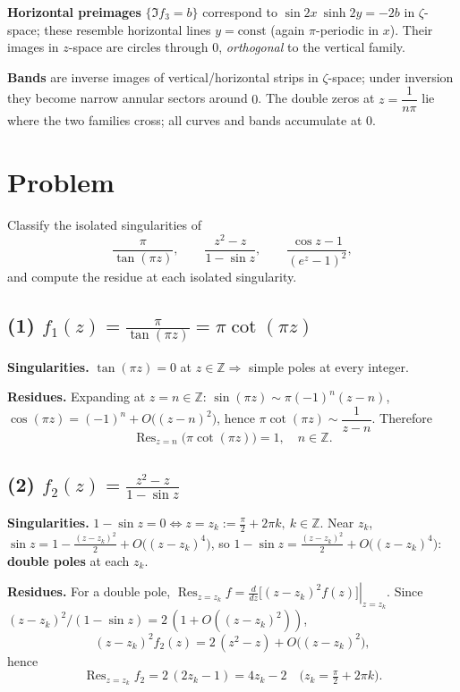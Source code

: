 \documentclass[12pt,a4paper]{article}
\begin{document}
	\textbf{Horizontal preimages} \(\{\Im f_3=b\}\) correspond to \(\sin 2x\ \sinh 2y=-2b\) in \(\zeta\)-space; these resemble horizontal lines \(y=\text{const}\) (again \(\pi\)-periodic in \(x\)).
	Their images in \(z\)-space are circles through \(0\), \emph{orthogonal} to the vertical family.
	
	\textbf{Bands} are inverse images of vertical/horizontal strips in \(\zeta\)-space; under inversion they become narrow annular sectors around \(0\).
	The double zeros at \(z=\dfrac{1}{n\pi}\) lie where the two families cross; all curves and bands accumulate at \(0\).
	
	\section*{Problem}
	Classify the isolated singularities of
	\[
	\frac{\pi}{\tan(\pi z)},\qquad
	\frac{z^2-z}{1-\sin z},\qquad
	\frac{\cos z-1}{(e^{z}-1)^2},
	\]
	and compute the residue at each isolated singularity.
	
	\bigskip
	
	\subsection*{(1) \(\displaystyle f_1(z)=\frac{\pi}{\tan(\pi z)}=\pi\cot(\pi z)\)}
	\textbf{Singularities.}
	\(\tan(\pi z)=0\) at \(z\in\mathbb Z\Rightarrow\) simple poles at every integer.
	
	\textbf{Residues.}
	Expanding at \(z=n\in\mathbb Z\):
	\(\sin(\pi z)\sim\pi(-1)^n(z-n)\), \(\cos(\pi z)=(-1)^n+O\!\big((z-n)^2\big)\),
	hence \(\pi\cot(\pi z)\sim\dfrac{1}{z-n}\).
	Therefore
	\[
	\boxed{\ \operatorname{Res}_{z=n}\bigl(\pi\cot(\pi z)\bigr)=1,\quad n\in\mathbb Z.\ }
	\]
	
	\bigskip
	
	\subsection*{(2) \(\displaystyle f_2(z)=\frac{z^2-z}{1-\sin z}\)}
	\textbf{Singularities.}
	\(1-\sin z=0 \iff z=z_k:=\frac{\pi}{2}+2\pi k,\ k\in\mathbb Z\).
	Near \(z_k\),
	\(\sin z=1-\frac{(z-z_k)^2}{2}+O\!\big((z-z_k)^4\big)\),
	so \(1-\sin z=\frac{(z-z_k)^2}{2}+O\!\big((z-z_k)^4\big)\):
	\textbf{double poles} at each \(z_k\).
	
	\textbf{Residues.}
	For a double pole,
	\(\displaystyle \operatorname{Res}_{z=z_k} f=\left.\frac{d}{dz}\big[(z-z_k)^2 f(z)\big]\right|_{z=z_k}\).
	Since \((z-z_k)^2/(1-\sin z)=2\,(1+O((z-z_k)^2))\),
	\[
	(z-z_k)^2 f_2(z)=2\,(z^2-z)+O\!\big((z-z_k)^2\big),
	\]
	hence
	\[
	\boxed{\ \operatorname{Res}_{z=z_k} f_2=2\,(2z_k-1)=4z_k-2
		\quad\bigl(z_k=\tfrac{\pi}{2}+2\pi k\bigr).\ }
	\]
	
\end{document}
